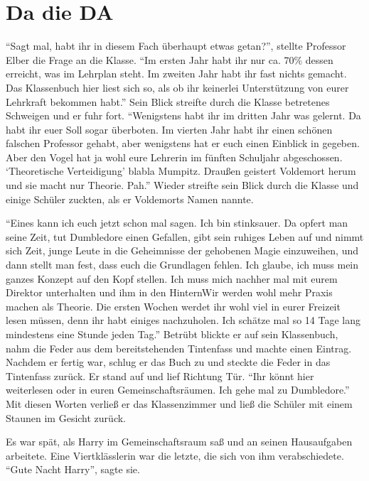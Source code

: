 \chapter{Da die DA}


\enquote{Sagt mal, habt ihr in diesem Fach überhaupt etwas getan?}, stellte Professor Elber die Frage an die Klasse. \enquote{Im ersten Jahr habt ihr nur ca. 70\% dessen erreicht, was im Lehrplan steht. Im zweiten Jahr habt ihr fast nichts gemacht. Das Klassenbuch hier liest sich so, als ob ihr keinerlei Unterstützung von eurer Lehrkraft bekommen habt.} Sein Blick streifte durch die Klasse \gst betretenes Schweigen \gst und er fuhr fort. \enquote{Wenigstens habt ihr im dritten Jahr was gelernt. Da habt ihr euer Soll sogar überboten. Im vierten Jahr habt ihr einen schönen falschen Professor gehabt, aber wenigstens hat er euch einen Einblick in  gegeben. Aber den Vogel hat ja wohl eure Lehrerin im fünften Schuljahr abgeschossen. \enquote{Theoretische Verteidigung} \gst blabla Mumpitz. Draußen geistert Voldemort herum und sie macht nur Theorie. Pah.} Wieder streifte sein Blick durch die Klasse und einige Schüler zuckten, als er Voldemorts Namen nannte.

\enquote{Eines kann ich euch jetzt schon mal sagen. Ich bin stinksauer. Da opfert man seine Zeit, tut Dumbledore einen Gefallen, gibt sein ruhiges Leben auf und nimmt sich Zeit, junge Leute in die Geheimnisse der gehobenen Magie einzuweihen, und dann stellt man fest, dass euch die Grundlagen fehlen. Ich glaube, ich muss mein ganzes Konzept auf den Kopf stellen. Ich muss mich nachher mal mit eurem Direktor unterhalten und ihm in den Hintern\abs Wir werden wohl mehr Praxis machen als Theorie. Die ersten Wochen werdet ihr wohl viel in eurer Freizeit lesen müssen, denn ihr habt einiges nachzuholen. Ich schätze mal so 14 Tage lang mindestens eine Stunde jeden Tag.} Betrübt blickte er auf sein Klassenbuch, nahm die Feder aus dem bereitstehenden Tintenfass und machte einen Eintrag. Nachdem er fertig war, schlug er das Buch zu und steckte die Feder in das Tintenfass zurück. Er stand auf und lief Richtung Tür. \enquote{Ihr könnt hier weiterlesen oder in euren Gemeinschaftsräumen. Ich gehe mal zu Dumbledore.} Mit diesen Worten verließ er das Klassenzimmer und ließ die Schüler mit einem Staunen im Gesicht zurück.

Es war spät, als Harry im Gemeinschaftsraum saß und an seinen Hausaufgaben arbeitete. Eine Viertklässlerin war die letzte, die sich von ihm verabschiedete. \enquote{Gute Nacht Harry}, sagte sie.


